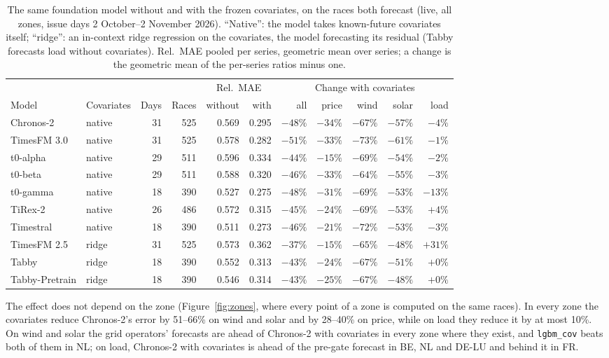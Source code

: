 \documentclass[11pt,a4paper]{article}
\newcommand{\m}[1]{\texttt{#1}}
\begin{document}
\begin{table}[t]
\centering\small
\setlength{\tabcolsep}{4.5pt}
\caption{The same foundation model without and with the frozen covariates, on the races both forecast (live, all
zones, issue days 2 October--2 November 2026). ``Native'': the model takes known-future covariates itself; ``ridge'': an
in-context ridge regression on the covariates, the model forecasting its residual (Tabby forecasts load without
covariates). Rel.\ MAE pooled per series, geometric mean over series; a change is the geometric mean of the
per-series ratios minus one.}
\label{tab:cov}
\begin{tabular}{@{}llrrrrrrrrr@{}}
\toprule
& & & & \multicolumn{2}{c}{Rel.\ MAE} & \multicolumn{5}{c}{Change with covariates} \\
\cmidrule(lr){5-6}\cmidrule(l){7-11}
Model & Covariates & Days & Races & without & with & all & price & wind & solar & load \\
\midrule
Chronos-2 & native & 31 & 525 & 0.569 & 0.295 & $-48\%$ & $-34\%$ & $-67\%$ & $-57\%$ & $-4\%$ \\
TimesFM 3.0 & native & 31 & 525 & 0.578 & 0.282 & $-51\%$ & $-33\%$ & $-73\%$ & $-61\%$ & $-1\%$ \\
t0-alpha & native & 29 & 511 & 0.596 & 0.334 & $-44\%$ & $-15\%$ & $-69\%$ & $-54\%$ & $-2\%$ \\
t0-beta & native & 29 & 511 & 0.588 & 0.320 & $-46\%$ & $-33\%$ & $-64\%$ & $-55\%$ & $-3\%$ \\
t0-gamma & native & 18 & 390 & 0.527 & 0.275 & $-48\%$ & $-31\%$ & $-69\%$ & $-53\%$ & $-13\%$ \\
TiRex-2 & native & 26 & 486 & 0.572 & 0.315 & $-45\%$ & $-24\%$ & $-69\%$ & $-53\%$ & $+4\%$ \\
Timestral & native & 18 & 390 & 0.511 & 0.273 & $-46\%$ & $-21\%$ & $-72\%$ & $-53\%$ & $-3\%$ \\
\midrule
TimesFM 2.5 & ridge & 31 & 525 & 0.573 & 0.362 & $-37\%$ & $-15\%$ & $-65\%$ & $-48\%$ & $+31\%$ \\
Tabby & ridge & 18 & 390 & 0.552 & 0.313 & $-43\%$ & $-24\%$ & $-67\%$ & $-51\%$ & $+0\%$ \\
Tabby-Pretrain & ridge & 18 & 390 & 0.546 & 0.314 & $-43\%$ & $-25\%$ & $-67\%$ & $-48\%$ & $+0\%$ \\
\bottomrule
\end{tabular}
\end{table}

The effect does not depend on the zone (Figure~\ref{fig:zones}, where every point of a zone is computed on the same
races). In every zone the covariates reduce Chronos-2's error by 51--66\% on wind and solar and by 28--40\% on
price, while on load they reduce it by at most 10\%. On wind and solar the grid operators' forecasts
are ahead of Chronos-2 with covariates in every zone where they exist, and \m{lgbm\_cov} beats both of them in NL; on
load, Chronos-2 with covariates is ahead of the pre-gate forecast in BE, NL and DE-LU and behind it in FR.
\end{document}
